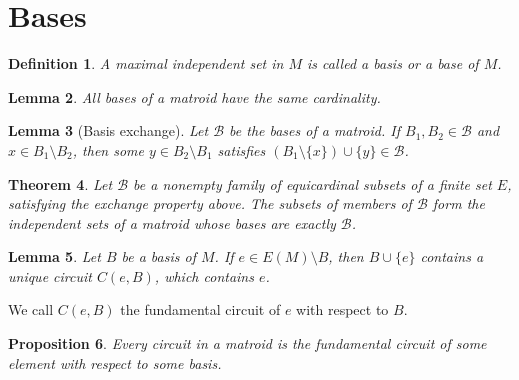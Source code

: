 \documentclass[11pt,letterpaper]{article}
\newcommand{\B}{\mathcal{B}}
\theoremstyle{appendix-result}
\newtheorem{theorem}{Theorem}[section]
\newtheorem{lemma}[theorem]{Lemma}
\newtheorem{proposition}[theorem]{Proposition}
\theoremstyle{appendix-definition}
\newtheorem{definition}[theorem]{Definition}
\begin{document}
\section{Bases}
\begin{definition}
    A maximal independent set in $M$ is called a basis or a base of $M$.
\end{definition}
\begin{lemma}
    All bases of a matroid have the same cardinality.
\end{lemma}
\begin{lemma}[Basis exchange]
    Let $\B$ be the bases of a matroid. If $B_1,B_2\in\B$ and $x\in B_1\setminus B_2$, then some $y\in B_2\setminus B_1$ satisfies $(B_1\setminus\{x\})\cup\{y\}\in\B$.
\end{lemma}
\begin{theorem}
    Let $\B$ be a nonempty family of equicardinal subsets of a finite set $E$, satisfying the exchange property above. The subsets of members of $\B$ form the independent sets of a matroid whose bases are exactly $\B$.
\end{theorem}
\begin{lemma}
    Let $B$ be a basis of $M$. If $e \in E(M)\setminus B$, then $B \cup \{e\}$ contains a unique circuit $C(e,B)$, which contains $e$.
\end{lemma}
We call $C(e, B)$ the fundamental circuit of $e$ with respect to $B$.
\begin{proposition}
    Every circuit in a matroid is the fundamental circuit of some element with respect to some basis.
\end{proposition}
\end{document}
